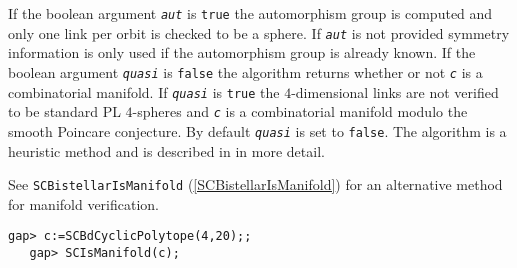 \documentclass[a4paper,11pt]{report}
\begin{document}
{{{ If the boolean argument \mbox{\texttt{\mdseries\slshape aut}} is \texttt{true} the automorphism group is computed and only one link per orbit is checked to
be a sphere. If \mbox{\texttt{\mdseries\slshape aut}} is not provided symmetry information is only used if the automorphism group is
already known. If the boolean argument \mbox{\texttt{\mdseries\slshape quasi}} is \texttt{false} the algorithm returns whether or not \mbox{\texttt{\mdseries\slshape c}} is a combinatorial manifold. If \mbox{\texttt{\mdseries\slshape quasi}} is \texttt{true} the $4$-dimensional links are not verified to be standard PL $4$-spheres and \mbox{\texttt{\mdseries\slshape c}} is a combinatorial manifold modulo the smooth Poincare conjecture. By default \mbox{\texttt{\mdseries\slshape quasi}} is set to \texttt{false}. The algorithm is a heuristic method and is described in \cite{Paixao143SphereRec} in more detail.

 See \texttt{SCBistellarIsManifold} (\ref{SCBistellarIsManifold}) for an alternative method for manifold verification. 
\begin{Verbatim}[commandchars=!@|,fontsize=\small,frame=single,label=Example]
   gap> c:=SCBdCyclicPolytope(4,20);;
   gap> SCIsManifold(c);
   
\end{Verbatim}
 }

 }

 }

 
\end{document}
